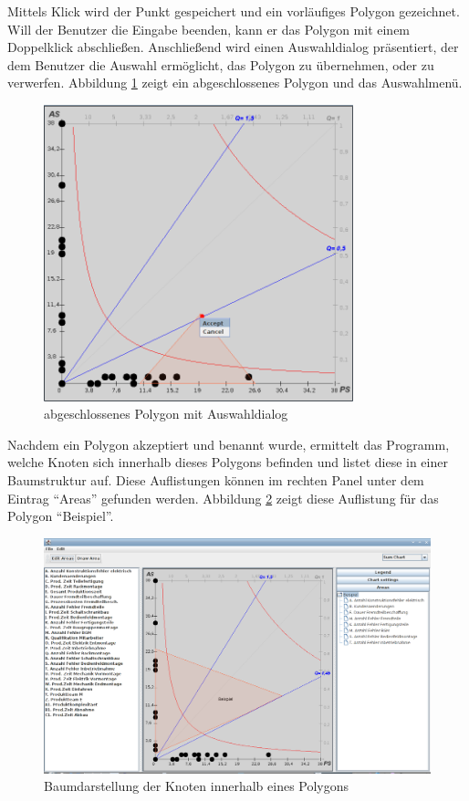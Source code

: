 Mittels Klick wird der Punkt gespeichert und ein vorläufiges Polygon gezeichnet. Will der Benutzer die Eingabe beenden, kann er das Polygon mit einem Doppelklick abschließen. Anschließend wird einen Auswahldialog präsentiert, der dem Benutzer die Auswahl ermöglicht, das Polygon zu übernehmen, oder zu verwerfen.
Abbildung \ref{menü} zeigt ein abgeschlossenes Polygon und das Auswahlmenü.
\begin{figure}
	\centering
	\includegraphics[width=0.8\textwidth]{pictures/menu.png}
	\caption{abgeschlossenes Polygon mit Auswahldialog}
	\label{menü}
\end{figure}

Nachdem ein Polygon akzeptiert und benannt wurde, ermittelt das Programm, welche Knoten sich innerhalb dieses Polygons befinden und listet diese in einer Baumstruktur auf. Diese Auflistungen können im rechten Panel unter dem Eintrag ``Areas'' gefunden werden. Abbildung \ref{baum} zeigt diese Auflistung für das Polygon ``Beispiel''.
\begin{figure}
	\centering
	\includegraphics[width=1\textwidth]{pictures/baum.png}
	\caption{Baumdarstellung der Knoten innerhalb eines Polygons}
	\label{baum}
\end{figure}

